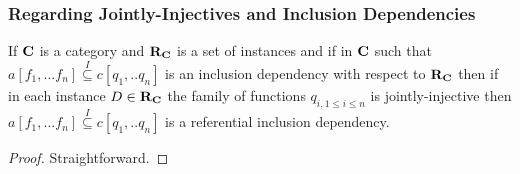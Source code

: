\subsubsection{Regarding Jointly-Injectives and Inclusion Dependencies}

\begin{lemma}
If $\textbf{C}$ is a category and $\textbf{R}_{\textbf{C}}$ is a set of instances and if
\fnsourceqnsource
in $\textbf{C}$
such that $a[f_1,...f_n] \overset{I}{\subseteq} c[q_1,..q_n]$ is an inclusion dependency with respect  to $\textbf{R}_{\textbf{C}}$ then if in each instance $D \in \textbf{R}_{\textbf{C}}$ the family of functions
$q_{i, 1 \leq i \leq n}$ is jointly-injective then $a[f_1,...f_n] \overset{I}{\subseteq} c[q_1,..q_n]$ is a referential inclusion dependency.
\end{lemma}
\begin{proof}
Straightforward.
\end{proof}

\iffalse
\newcommand {\qnsourcediag}{
$
\begin{array}{c p{0.5cm} c  }
             &&   \Rnode{b}{b_1} \\[0.01cm]
\Rnode{a}{a} &&                \\[0.01cm] 
             &&   \Rnode{c}{b_n}         
\end{array} 
\begin{arrows}
\ncarr{a}{b}
\alabel{q_1}
\ncarr{a}{c}
\blabel{q_n}
\end{arrows}
$  
}
\fi


